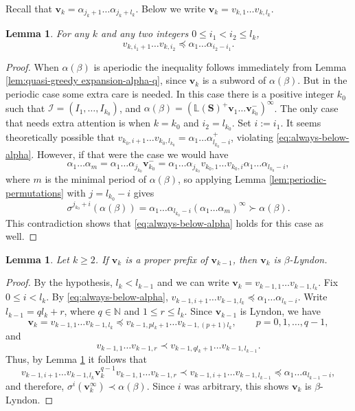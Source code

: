 \documentclass[11pt]{amsart}
\newtheorem{lemma}[theorem]{Lemma}
\theoremstyle{definition}
\theoremstyle{remark}
\numberwithin{equation}{section}
\newcommand{\N}{\ensuremath{\mathbb{N}}}
\renewcommand{\L}{\ensuremath{\mathbb{L}}}
\newcommand{\II}{\mathcal{I}}
\newcommand{\cs}{ {\mathbf{S}}}
\renewcommand{\v}{\mathbf{v}}
\newcommand{\f}{\infty}
\newcommand{\al}{\alpha}
\newcommand{\lle}{\preccurlyeq}
\newcommand{\si}{\sigma}
\begin{document}
{Recall that $\v_k=\al_{j_k+1}\ldots \al_{j_k+l_k}$.} Below we write $\v_k=v_{k,1}\dots v_{k,l_k}$. %

\begin{lemma} \label{lem:always-below-alpha}
For any $k$ and any two integers $0\leq i_1<i_2\leq l_k$,
\begin{equation} \label{eq:always-below-alpha}
v_{k,i_1+1}\dots v_{k,i_2}\lle \al_1\dots\al_{i_2-i_1}.
\end{equation}
\end{lemma}

\begin{proof}
When $\al(\beta)$ is aperiodic the inequality follows immediately from Lemma \ref{lem:quasi-greedy expansion-alpha-q}, since $\v_k$ is a subword of $\al(\beta)$. But in the periodic case some extra care is needed. In this case there is a positive integer $k_0$ such that $\II=(I_1,\dots,I_{k_0})$, and $\al(\beta)=(\L(\cs)^+\v_1\dots\v_{k_0}^-)^\f$. The only case that needs extra attention is when $k=k_0$ and $i_2=l_{k_0}$. Set $i:=i_1$. It seems theoretically possible that $v_{k_0,i+1}\dots v_{k_0,l_{k_0}}=\al_1\dots\al_{l_{k_0}-i}^+$, violating \eqref{eq:always-below-alpha}. However, if that were the case we would have
\[
\al_1\dots\al_m=\al_1\dots\al_{j_{k_0}}\v_{k_0}^-=\al_1\dots\al_{j_{k_0}}v_{k_0,1}\dots v_{k_0,i}\al_1\dots \al_{l_{k_0}-i},
\]
where $m$ is the minimal period of $\al(\beta)$, so applying Lemma \ref{lem:periodic-permutations} with $j=l_{k_0}-i$ gives
\[
\si^{j_{k_0}+i}(\al(\beta))=\al_1\dots\al_{l_{k_0}-i}(\al_1\dots\al_m)^\f\succ \al(\beta).
\]
This contradiction shows that \eqref{eq:always-below-alpha} holds for this case as well.
\end{proof}

\begin{lemma} \label{lem:prefix-beta-Lyndon}
Let $k\geq 2$. If $\v_k$ is a proper prefix of $\v_{k-1}$, then $\v_k$ is $\beta$-Lyndon.
\end{lemma}

\begin{proof}
By the hypothesis, $l_k<l_{k-1}$ and we can write $\v_k=v_{k-1,1}\dots v_{k-1,l_k}$. Fix $0\leq i<l_k$. By \eqref{eq:always-below-alpha}, $v_{k-1,i+1}\dots v_{k-1,l_k}\lle \al_1\dots\al_{l_k-i}$. Write $l_{k-1}=ql_k+r$, where $q\in\N$ and $1\leq r\leq l_k$. Since $\v_{k-1}$ is Lyndon, we have
\[
\v_k=v_{k-1,1}\dots v_{k-1,l_k}\lle v_{k-1,pl_k+1}\dots v_{k-1,(p+1)l_k}, \qquad p=0,1,\dots,q-1,
\]
and
\[
v_{k-1,1}\dots v_{k-1,r}\prec v_{k-1,ql_k+1}\dots v_{k-1,l_{k-1}}.
\]
Thus, by Lemma \ref{lem:always-below-alpha} it follows that
\[
v_{k-1,i+1}\dots v_{k-1,l_k} \v_k^{q-1} v_{k-1,1}\dots v_{k-1,r} \prec v_{k-1,i+1}\dots v_{k-1,l_{k-1}} \lle \al_1\dots a_{l_{k-1}-i},
\]
and therefore, $\si^i(\v_k^\f)\prec\al(\beta)$. Since $i$ was arbitrary, this shows $\v_k$ is $\beta$-Lyndon.
\end{proof}
\end{document}
